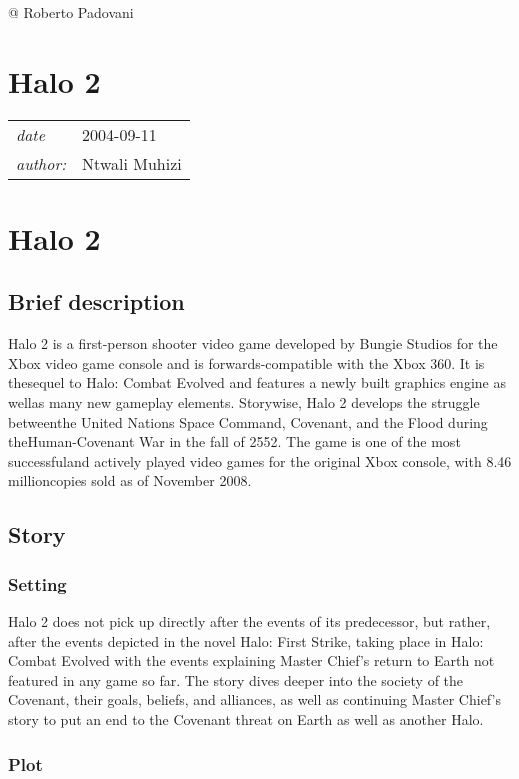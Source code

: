 \documentclass[a4paper,10pt]{book}
\newcommand{\pageHeader}[4]{
    \section{#1}
    \vspace{-0.3cm}
    \begin{table}[h!]
     \begin{tabular}{ll}
        \hline
        \textit{date} & #2 \\
        \textit{author: } & #3\\
        \hline
     \end{tabular}
    \end{table}
    \vspace{-0.3cm}
}
\begin{document}
 
 @ Roberto Padovani 
 
 \newpage\pageHeader{Halo 2}{2004-09-11}{Ntwali Muhizi}{Third  and arguably the best iteration of the halo franchise.. yes third}
 \section{ Halo 2 }
 \subsection{Brief description }
 
          Halo 2 is a first-person shooter video game developed by Bungie Studios for the Xbox video game console and is forwards-compatible with the Xbox 360. 
          It is thesequel to Halo:  Combat Evolved and features a newly built graphics engine as wellas many new gameplay elements. 
          Storywise, Halo 2 develops the struggle betweenthe United Nations Space Command, Covenant, and the Flood during theHuman-Covenant War in the fall of 2552. 
          The game is one of the most successfuland actively played video games for the original Xbox console, with 8.46 millioncopies sold as of November 2008.
         
 
 \subsection{Story }
 
 \subsubsection{Setting }
 
          Halo 2 does not pick up directly after the events of its predecessor, but rather, after the events depicted in the novel Halo: First Strike, taking place in Halo:
          Combat Evolved with the events explaining Master Chief's return to Earth not featured in any game so far. The story dives deeper into the society of the Covenant,
          their goals, beliefs, and alliances, as well as continuing Master Chief's story to put an end to the Covenant threat on Earth as well as another Halo. 
         
 
 \subsubsection{Plot }
 
\end{document}
